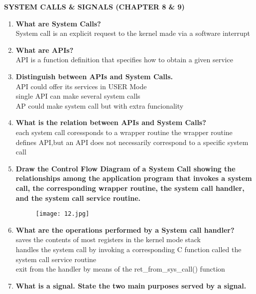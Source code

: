 \documentclass[a4paper,12pt]{article}
\begin{document}
\begin{flushleft}
 \textbf{SYSTEM CALLS \& SIGNALS (CHAPTER 8 \& 9)}\\
\begin{enumerate}
\item \textbf{ What are System Calls? }\\
{\color{red}System call is an explicit request to the kernel made via a software interrupt}\\
\item \textbf{ What are APIs?}\\
{\color{red}API is a function definition that specifies how to obtain a given service}\\
\item \textbf{ Distinguish between APIs and System Calls.}\\
{\color{red}API could offer its services in USER Mode\\
single API can make several system calls\\
AP could make system call but with extra funcionality}\\
\item \textbf{ What is the relation between APIs and System Calls?}\\
{\color{red}each system call coressponds to a wrapper routine the wrapper routine defines API,but an  API does not necessarily correspond to a specific system call}\\
\item \textbf{ Draw the Control Flow Diagram of a System Call showing the relationships among the application program that invokes a system call, the corresponding wrapper routine, the system call handler, and the system call service routine.}\\
\begin{figure}[H]
 \centering
  \texttt{[image: 12.jpg]}
  \label{fig:13}
\end{figure}
\item \textbf{ What are the operations performed by a System call handler?}\\
{\color{red}saves the contents of most registers in the kernel mode stack\\
handles the system call by invoking a corresponding C function called the system call service routine\\
exit from the handler by means of the ret\_from\_sys\_call() function}\\
\item \textbf{ What is a signal. State the two main purposes served by a signal.}\\

\end{enumerate}
\end{flushleft}
\end{document}
